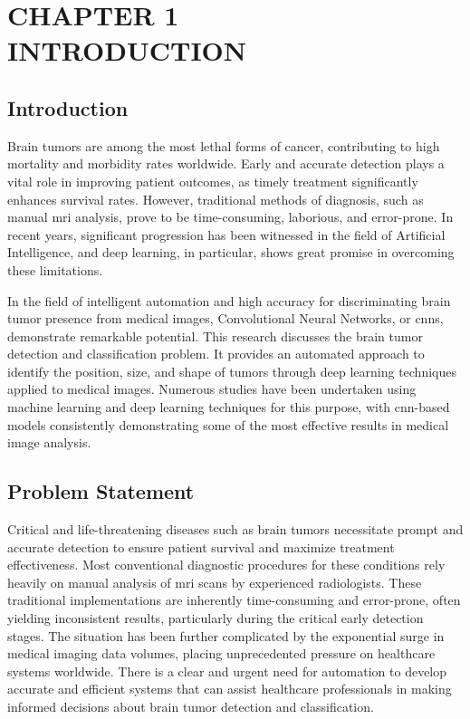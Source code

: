 
\section*{\Large\centering \textbf{CHAPTER 1 \\ INTRODUCTION }}
\setcounter{section}{1}

\subsection{Introduction}
Brain tumors are among the most lethal forms of cancer, contributing to high
mortality and morbidity rates worldwide. Early and accurate detection plays a
vital role in improving patient outcomes, as timely treatment significantly
enhances survival rates. However, traditional methods of diagnosis, such as
manual \gls{mri} analysis, prove to be time-consuming, laborious, and
error-prone. In recent years, significant progression has been witnessed in the
field of Artificial Intelligence, and deep learning, in particular, shows great
promise in overcoming these limitations.

In the field of intelligent automation and high accuracy for discriminating
brain tumor presence from medical images, Convolutional Neural Networks, or
\gls{cnn}s, demonstrate remarkable potential. This research discusses the brain
tumor detection and classification problem. It provides an automated approach
to identify the position, size, and shape of tumors through deep learning
techniques applied to medical images. Numerous studies have been undertaken
using machine learning and deep learning techniques for this purpose, with
\gls{cnn}-based models consistently demonstrating some of the most effective
results in medical image analysis.

\subsection{Problem Statement}
Critical and life-threatening diseases such as brain tumors necessitate prompt
and accurate detection to ensure patient survival and maximize treatment
effectiveness. Most conventional diagnostic procedures for these conditions
rely heavily on manual analysis of \gls{mri} scans by experienced radiologists.
These traditional implementations are inherently time-consuming and
error-prone, often yielding inconsistent results, particularly during the
critical early detection stages. The situation has been further complicated by
the exponential surge in medical imaging data volumes, placing unprecedented
pressure on healthcare systems worldwide. There is a clear and urgent need for
automation to develop accurate and efficient systems that can assist healthcare
professionals in making informed decisions about brain tumor detection and
classification.

